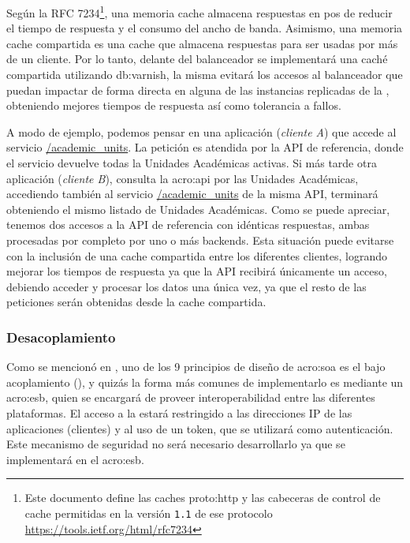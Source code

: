 Según la RFC 7234\footnote{Este documento define las caches \gls{proto:http} y las cabeceras de control de cache permitidas en la versión \texttt{1.1} de ese protocolo\\\url{https://tools.ietf.org/html/rfc7234}}, una memoria cache almacena respuestas en pos de reducir el tiempo de respuesta y el consumo del ancho de banda. Asimismo, una memoria cache compartida es una cache que almacena respuestas para ser usadas por más de un cliente. Por lo tanto, delante del balanceador se implementará una caché compartida utilizando \gls{db:varnish}, la misma evitará los accesos al balanceador que puedan impactar de forma directa en alguna de las instancias replicadas de la {\cloud}, obteniendo mejores tiempos de respuesta así como tolerancia a fallos.

A modo de ejemplo, podemos pensar en una aplicación (\textit{cliente A}) que accede al servicio \url{/academic_units}. La petición es atendida por la API de referencia, donde el servicio devuelve todas la Unidades Académicas activas. Si más tarde otra aplicación (\textit{cliente B}), consulta la \gls{acro:api} por las Unidades Académicas, accediendo también al servicio \url{/academic_units} de la misma API, terminará obteniendo el mismo listado de Unidades Académicas. Como se puede apreciar, tenemos dos accesos a la API de referencia con idénticas respuestas, ambas procesadas por completo por uno o más backends. Esta situación puede evitarse con la inclusión de una cache compartida entre los diferentes clientes, logrando mejorar los tiempos de respuesta ya que la API recibirá únicamente un acceso, debiendo acceder y procesar los datos una única vez, ya que el resto de las peticiones serán obtenidas desde la cache compartida.


\subsubsection{Desacoplamiento}

Como se mencionó en , uno de los 9 principios de diseño de \gls{acro:soa} es el bajo acoplamiento (), y quizás la forma más comunes de implementarlo es mediante un \gls{acro:esb}, quien se encargará de proveer interoperabilidad entre las diferentes plataformas. El acceso a la {\cloud} estará restringido a las direcciones IP de las aplicaciones (clientes) y al uso de un token, que se utilizará como autenticación. Este mecanismo de seguridad no será necesario desarrollarlo ya que se implementará en el \gls{acro:esb}.

